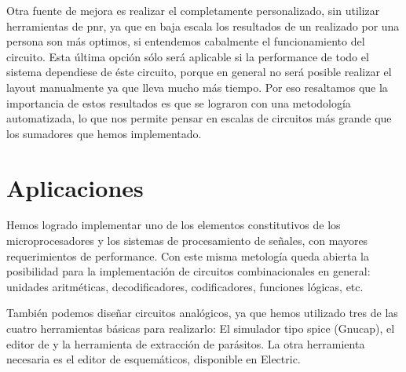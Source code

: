 Otra fuente de mejora es realizar el \layout completamente personalizado, sin utilizar herramientas de \gls{pnr}, ya que en baja escala los resultados de un \layout realizado por una persona son más optimos, si entendemos cabalmente el funcionamiento del circuito. Esta última opción sólo será aplicable si la performance de todo el sistema dependiese de éste circuito, porque en general no será posible realizar el layout manualmente ya que lleva mucho más tiempo. Por eso resaltamos que la importancia de estos resultados es que se lograron con una metodología automatizada, lo que nos permite pensar en escalas de circuitos más grande que los sumadores que hemos implementado.


\section{Aplicaciones}
Hemos logrado implementar uno de los elementos constitutivos de los microprocesadores y los sistemas de procesamiento de señales, con mayores requerimientos de performance. Con este misma metología queda abierta la posibilidad para la implementación de circuitos combinacionales en general: unidades aritméticas, decodificadores, codificadores, funciones lógicas, etc. 

También podemos diseñar circuitos analógicos, ya que hemos utilizado tres de las cuatro herramientas básicas para realizarlo: El simulador tipo spice (Gnucap), el editor de \layout y la herramienta de extracción de parásitos. La otra herramienta necesaria es el editor de esquemáticos, disponible en Electric.






